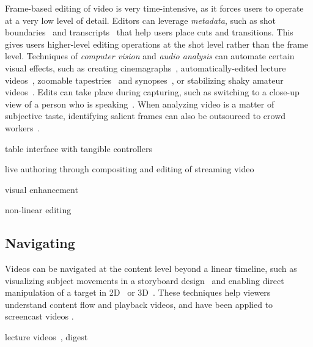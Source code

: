 Frame-based editing of video is very time-intensive, as it forces users to operate at a very low level of detail. Editors can leverage \emph{metadata}, such as shot boundaries~\cite{Casares:2002dx} and transcripts~\cite{Berthouzoz:2012} that help users place cuts and transitions. This gives users higher-level editing operations at the shot level rather than the frame level.
%
Techniques of \emph{computer vision} and \emph{audio analysis} can automate certain visual effects, such as creating cinemagraphs~\cite{Bai:2012, Joshi:2012}, automatically-edited lecture videos~\cite{Heck:2007}, zoomable tapestries~\cite{Barnes:2010} and synopses~\cite{Pritch:2009vl}, or stabilizing shaky amateur videos~\cite{Liu:2011}.
%
Edits can take place during capturing, such as switching to a close-up view of a person who is speaking~\cite{Ranjan:2010}.
%
When analyzing video is a matter of subjective taste, identifying salient frames can also be outsourced to crowd workers~\cite{Bernstein:2011uj}.

table interface with tangible controllers~\cite{Bartindale:2012:STS:2207676.2207700,Bartindale:2016:TSS:2818048.2819929}

live authoring through compositing and editing of streaming video~\cite{Freeman:2014:LLA:2611105.2557304}

visual enhancement~\cite{Santosa:2013:DST:2470654.2466148}

non-linear editing~\cite{Shen:2009:WNE:1518701.1518825}


\subsection{Navigating}
Videos can be navigated at the content level beyond a linear timeline, such as visualizing subject movements in a storyboard design~\cite{goldman2006schematic} and enabling direct manipulation of a target in 2D~\cite{Dragicevic:2008:VBD:1357054.1357096,Goldman:2008:VOA:1449715.1449719,Karrer:2008:DDM:1357054.1357097} or 3D~\cite{Nguyen:2013:DMV:2470654.2466150}. These techniques help viewers understand content flow and playback videos, and have been applied to screencast videos \cite{Denoue:2013:RDM:2451176.2451190,Nguyen:2015:MST:2702123.2702209}.

lecture videos~\cite{Tang:2006:DIU:1111449.1111523}, digest~\cite{Pavel:2014:VDB:2642918.2647400}


